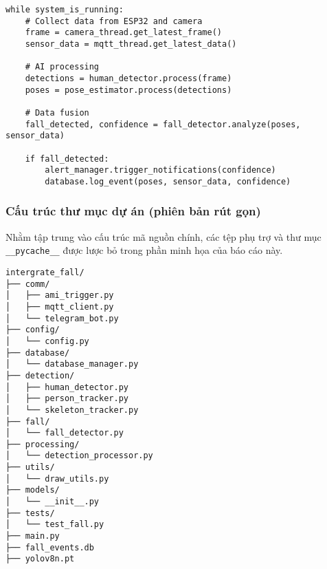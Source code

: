 \begin{verbatim}
while system_is_running:
    # Collect data from ESP32 and camera
    frame = camera_thread.get_latest_frame()
    sensor_data = mqtt_thread.get_latest_data()
    
    # AI processing
    detections = human_detector.process(frame)
    poses = pose_estimator.process(detections)
    
    # Data fusion
    fall_detected, confidence = fall_detector.analyze(poses, sensor_data)
    
    if fall_detected:
        alert_manager.trigger_notifications(confidence)
        database.log_event(poses, sensor_data, confidence)
\end{verbatim}

\subsubsection{Cấu trúc thư mục dự án (phiên bản rút gọn)}
\label{subsubsec:project_structure}


Nhằm tập trung vào cấu trúc mã nguồn chính, các tệp phụ trợ và thư mục \texttt{\_\_pycache\_\_} được lược bỏ trong phần minh họa của báo cáo này.

\begin{verbatim}
intergrate_fall/
├── comm/
│   ├── ami_trigger.py
│   ├── mqtt_client.py
│   └── telegram_bot.py
├── config/
│   └── config.py
├── database/
│   └── database_manager.py
├── detection/
│   ├── human_detector.py
│   ├── person_tracker.py
│   └── skeleton_tracker.py
├── fall/
│   └── fall_detector.py
├── processing/
│   └── detection_processor.py
├── utils/
│   └── draw_utils.py
├── models/
│   └── __init__.py
├── tests/
│   └── test_fall.py
├── main.py
├── fall_events.db
├── yolov8n.pt
\end{verbatim}
